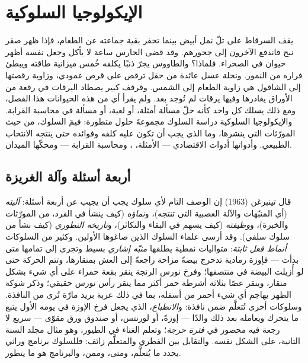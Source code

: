 \chapter{الإيكولوجيا السلوكية}\label{ch:b3:behavioural-ecology}

يقف السرقاط على تلّ نمل أبيض بينما تحفر بقية جماعته عن
الطعام، فإذا ظهر صقر نبح فاندفع الآخرون إلى جحورهم. وقد قضى
الحارس ساعة لا يأكل وجعل نفسه أظهر حيوان في الصحراء. فلماذا؟
والطاووس يجرّ ذنبًا يكلفه خُمس ميزانية طاقته ويبطئ فراره من
النمور. ونحلة عسل عائدة من حقل ترقص على قرص عمودي، وزاوية
رقصتها إلى الشاقول هي زاوية الطعام إلى الشمس. وقرقف كبير
يصطاد اليرقات في رقعة من الأوراق يغادرها وفيها يرقات لم
تُوجد بعد. ولم يقرأ أي من هذه الحيوانات هذا الفصل، ومع ذلك
يسلك كل واحد كأنه حلّ مسألة أمثلة، أو لعبة، أو مسألة في
محاسبة القرابة. والإيكولوجيا السلوكية دراسة السلوك مجموعةَ
حلول متطورة: فيمَ السلوك، من حيث المورّثات التي ينشرها، وما
الذي يجب أن تكون عليه كلفه وفوائده حتى ينتجه الانتخاب
الطبيعي. وأدواتها أدوات الاقتصادي --- الأمثلة، ، ومحاسبة القرابة --- ومحكّها الميدان.

\section{أربعة أسئلة وآلة الغريزة}

\begin{definition}\label{def:b3:behavioural-ecology:tinbergen}
قال تينبرغن (1963) إن الوصف التام لأي سلوك يجب أن يجيب عن
أربعة أسئلة: \emph{آليته} (أي المنبّهات والآلة العصبية التي
تنتجه)، و\emph{نماؤه} (كيف ينشأ في الفرد، من المورّثات
والخبرة)، و\emph{وظيفته} (كيف يسهم في البقاء والتكاثر)،
و\emph{تاريخه التطوري} (كيف نشأ من سلوك سلفي). وقد أرسى
علماء السلوك الذين صاغوها الأولين. وكثير من السلوكات
\emph{أنماط فعل ثابتة}: متواليات نمطية يطلقها \emph{منبّه
إشاري} بسيط وتجري إلى تمامها متى بدأت --- فإوزة رمادية تدحرج
بيضةً مزاحة راجعةً إلى العش بمنقارها، وتتم الحركة حتى لو
أُزيلت البيضة في منتصفها؛ وفرخ نورس الرنجة ينقر بقعة حمراء
على أي شيء بشكل منقار، وينقر عصًا بثلاثة أشرطة حمر أكثر مما
ينقر رأس نورس حقيقي؛ وذكر شوكة الظهر يهاجم أي شيء أحمر من
أسفله، بما في ذلك عربة بريد مارّة تُرى من النافذة. وسلوكات
أخرى تُتعلَّم ضمن نافذة: و\emph{الانطباع}، الذي يجعل فرخ
الإوزة في يومه الأول يتبع ما يتحرك ويعامله بعد ذلك والدًا ---
إوزةً، أو لورنتس، أو صندوق ورق مقوّى --- سريع لا رجعة فيه
محصور في \emph{فترة حرجة}؛ وتعلم الغناء في الطيور، وهو مثال
مجلد السنة الثانية، على الشكل نفسه. والتقابل بين الفطري
والمتعلَّم زائف: فللسلوك برنامج وراثي يحدد ما يُتعلَّم، ومتى،
وممن، والبرنامج هو ما يتطور.
\end{definition}


